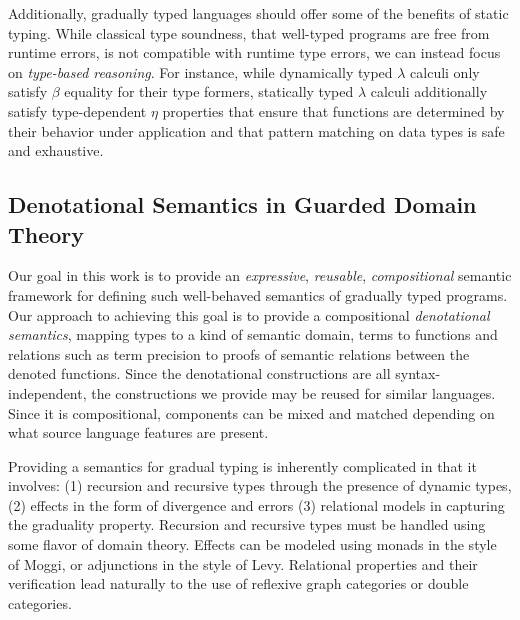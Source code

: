 Additionally, gradually typed languages should offer some of the
benefits of static typing. While classical type soundness, that
well-typed programs are free from runtime errors, is not compatible
with runtime type errors, we can instead focus on \emph{type-based
reasoning}. For instance, while dynamically typed $\lambda$ calculi
only satisfy $\beta$ equality for their type formers, statically typed
$\lambda$ calculi additionally satisfy type-dependent $\eta$
properties that ensure that functions are determined by their behavior
under application and that pattern matching on data types
is safe and exhaustive.


\subsection{Denotational Semantics in Guarded Domain Theory}

Our goal in this work is to provide an \emph{expressive},
\emph{reusable}, \emph{compositional} semantic framework for defining
such well-behaved semantics of gradually typed programs.
%
Our approach to achieving this goal is to provide a compositional
\emph{denotational semantics}, mapping types to a kind of semantic
domain, terms to functions and relations such as term precision to
proofs of semantic relations between the denoted functions.
%
Since the denotational constructions are all syntax-independent, the
constructions we provide may be reused for similar languages. Since it
is compositional, components can be mixed and matched depending on
what source language features are present.

Providing a semantics for gradual typing is inherently complicated in
that it involves: (1) recursion and recursive types through the
presence of dynamic types, (2) effects in the form of divergence and
errors (3) relational models in capturing the graduality
property. Recursion and recursive types must be handled using some
flavor of domain theory. Effects can be modeled using monads in the
style of Moggi, or adjunctions in the style of
Levy\cite{moggi,levy}. Relational properties and their verification
lead naturally to the use of reflexive graph categories or double
categories\cite{reflgraphcats,doublecats}.

